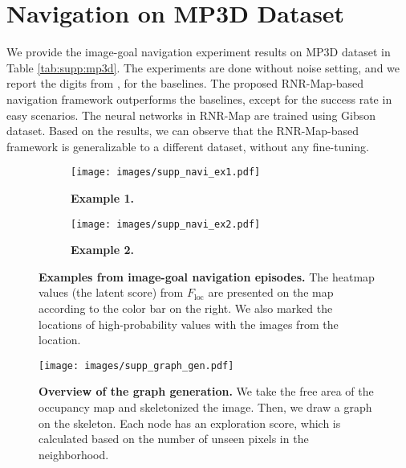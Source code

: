 \documentclass[10pt,twocolumn,letterpaper]{article}
\begin{document}
\section{Navigation on MP3D Dataset}\label{appendix:navi_mp3d}

We provide the image-goal navigation experiment results on MP3D dataset in Table \ref{tab:supp:mp3d}.
%
The experiments are done without noise setting, and we report the digits from \cite{NRNS}, \cite{SLING} for the baselines.
%
The proposed RNR-Map-based navigation framework outperforms the baselines, except for the success rate in easy scenarios.
%
The neural networks in RNR-Map are trained using Gibson \cite{xiazamirhe2018gibsonenv} dataset. 
%
Based on the results, we can observe that the RNR-Map-based framework is generalizable to a different dataset, without any fine-tuning.

\begin{figure*}[t]
\centering
\begin{subfigure}{\textwidth}
  \centering
  \texttt{[image: images/supp\_navi\_ex1.pdf]}
  \caption{\textbf{Example 1.}}
  \label{fig:supp:navi1}
\end{subfigure}
\bigskip
\begin{subfigure}{\textwidth}
\centering
  \texttt{[image: images/supp\_navi\_ex2.pdf]}
  \caption{\textbf{Example 2.}}
  \label{fig:supp:navi2}
\end{subfigure}
\caption{\textbf{Examples from image-goal navigation episodes.} The heatmap values (the latent score) from $F_\mathrm{loc}$ are presented on the map according to the color bar on the right. We also marked the locations of high-probability values with the images from the location.} 
\label{fig:supp:navi}
\end{figure*}

%
\begin{figure*}[t]
  \centering
  \texttt{[image: images/supp\_graph\_gen.pdf]}
  \caption{\textbf{Overview of the graph generation.} We take the free area of the occupancy map and skeletonized the image. Then, we draw a graph on the skeleton. Each node has an exploration score, which is calculated based on the number of unseen pixels in the neighborhood.}  
\label{fig:supp:graph_gen}
\end{figure*}
\end{document}
